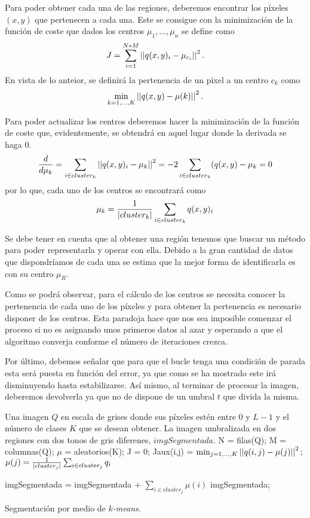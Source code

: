 Para poder obtener cada una de las regiones, deberemos encontrar los píxeles $(x,y)$ que pertenecen a cada una. Este se consigue con la minimización de la función de coste que dados los centros $\mu_1, \dots,\mu_n$ se define como
$$J=\sum_{i=1}^{N*M}\left\vert\left\vert q(x,y)_i-\mu_{c_i}\right\vert\right\vert^2.$$
En vista de lo anteior, se definirá la pertenencia de un pixel a un centro $c_k$ como 
$$\min_{k=1,\dots,K} \left\vert\left\vert q(x,y)-\mu(k)\right\vert\right\vert^2.$$

Para poder actualizar los centros deberemos hacer la minimización de la función de coste que, evidentemente, se obtendrá en aquel lugar donde la derivada se haga 0. 
$$\frac{d}{d \mu_k} = \sum_{i\in cluster_k} \left\vert\left\vert q(x,y)_i-\mu_k\right\vert\right\vert^2 = -2\sum_{i\in cluster_k}(q(x,y)-\mu_k=0$$
por lo que, cada uno de los centros se encontrará como 
$$\mu_k = \frac{1}{\left\vert cluster_k\right\vert}\sum_{i\in cluster_k}q(x,y)_i$$

Se debe tener en cuenta que al obtener una región tenemos que buscar un método para poder representarla y operar con ella. Debido a la gran cantidad de datos que dispondríamos de cada una se estima que la mejor forma de identificarla es con su centro $\mu_R$. 

Como se podrá observar, para el cálculo de los centros se necesita conocer la pertenencia de cada uno de los píxeles y para obtener la pertenencia es necesario disponer de los centros. Esta paradoja hace que nos sea imposible comenzar el proceso si no es asignando unos primeros datos al azar y esperando a que el algoritmo converja conforme el número de iteraciones crezca.

Por último, debemos señalar que para que el bucle tenga una condición de parada esta será puesta en función del error, ya que como se ha mostrado este irá disminuyendo hasta estabilizarse. Así mismo, al terminar de procesar la imagen, deberemos devolverla ya que no de dispone de un umbral $t$ que divida la misma.

\begin{algorithm}
\begin{algorithmic}[1]
\REQUIRE Una imagen $Q$ en escala de grises donde sus píxeles estén entre $0$ y $L-1$ y el número de clases $K$ que se desean obtener.
\ENSURE La imagen umbralizada en dos regiones con dos tonos de gris diferenes, $imgSegmentada$.
\STATE N = filas(Q);
\STATE M = columnas(Q);
\STATE $\mu$ = aleatorios(K);
\STATE J = 0;
\REPEAT 
            \STATE Jaux(i,j) = $\min_{j=1,\dots,K} \left\vert\left\vert q(i,j)-\mu(j)\right\vert\right\vert^2;$
        \ENDFOR
    \ENDFOR
        \STATE $\mu(j) = \frac{1}{\left\vert cluster_j\right\vert}\sum_{i\in cluster_j}q_i$  
    \ENDFOR 
{}

    \STATE imgSegmentada = imgSegmentada + $\sum_{i\in cluster_j}\mu(i)$
\ENDFOR
\RETURN imgSegmentada;
\end{algorithmic}
\caption{Segmentación por medio de {\em $k$-means}.}\label{alg:kmeans}
\end{algorithm}


